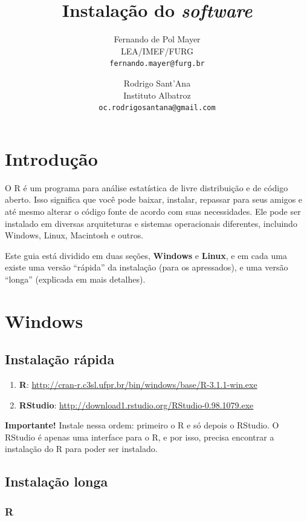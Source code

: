 \documentclass[a4paper,12pt]{article}\usepackage[]{graphicx}\usepackage[]{color}
\title{Instalação do \textit{software} \R}
\author{Fernando de Pol Mayer \\
  LEA/IMEF/FURG \\
  \texttt{fernando.mayer@furg.br} \and Rodrigo Sant'Ana \\
  Instituto Albatroz \\
  \texttt{oc.rodrigosantana@gmail.com}}
\date{}
\providecommand{\R}{\textsf{R}\xspace}
\providecommand{\RStudio}{\textsf{RStudio}\xspace}
\begin{document}
\maketitle
\tableofcontents

\section{Introdução}

O \R é um programa para análise estatística de livre distribuição e de
código aberto. Isso significa que você pode baixar, instalar, repassar
para seus amigos e até mesmo alterar o código fonte de acordo com suas
necessidades. Ele pode ser instalado em diversas arquiteturas e sistemas
operacionais diferentes, incluindo Windows, Linux, Macintosh e
outros.

Este guia está dividido em duas seções, \textbf{Windows} e
\textbf{Linux}, e em cada uma existe uma versão ``rápida'' da instalação
(para os apressados), e uma versão ``longa'' (explicada em mais
detalhes).

\section{Windows}

\subsection{Instalação rápida}

\begin{enumerate}
\item \textbf{\R}:
  \url{http://cran-r.c3sl.ufpr.br/bin/windows/base/R-3.1.1-win.exe}
\item \textbf{\RStudio}:
  \url{http://download1.rstudio.org/RStudio-0.98.1079.exe}
\end{enumerate}

\textbf{Importante!} Instale nessa ordem: primeiro o \R e só depois o
\RStudio. O \RStudio é apenas uma interface para o \R, e por isso,
precisa encontrar a instalação do \R para poder ser instalado.

\subsection{Instalação longa}

\subsubsection{\R}
\end{document}
